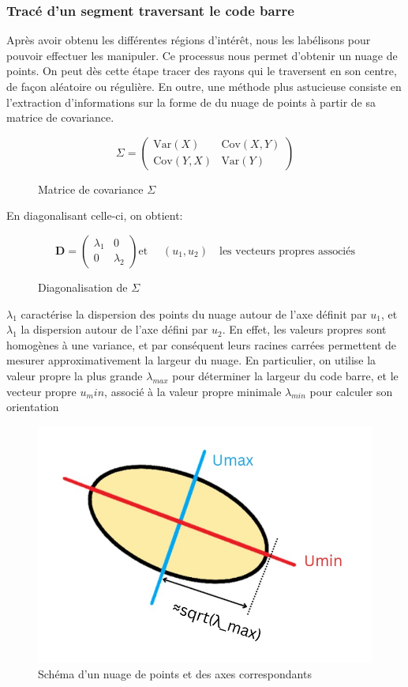 \documentclass{rapport}
\begin{document}
\subsubsection*{Tracé d'un segment traversant le code barre}
Après avoir obtenu les différentes régions d’intérêt, nous les labélisons pour pouvoir effectuer les manipuler.
Ce processus nous permet d'obtenir un nuage de points. 
On peut dès cette étape tracer des rayons qui le traversent en son centre, de façon aléatoire ou régulière.
En outre, une méthode plus astucieuse consiste en l'extraction d'informations sur la forme de du nuage de points à partir de sa matrice de covariance. 
\begin{figure}[h!]
$$\Sigma = \begin{pmatrix} \text{Var}(X) & \text{Cov}(X, Y) \\ \text{Cov}(Y, X) & \text{Var}(Y) \end{pmatrix}$$
\caption{Matrice de covariance $\Sigma$}
\end{figure}
En diagonalisant celle-ci, on obtient:
\begin{figure}[h!]
$$\mathbf{D} = \begin{pmatrix} \lambda_1 & 0 \\ 0 & \lambda_2 \end{pmatrix} \text{et } \quad (u_1,u_2) \quad \text{les vecteurs propres associés}$$
\caption{Diagonalisation de $\Sigma$}
\end{figure}
$\lambda_1$ caractérise la dispersion des points du nuage autour de l'axe définit par $u_1$, et $\lambda_1$ la dispersion autour de l'axe défini par $u_2$.
En effet, les valeurs propres sont homogènes à une variance, et par conséquent leurs racines carrées permettent de mesurer approximativement la largeur du nuage. En particulier, on utilise la valeur propre la plus grande $\lambda_{max}$ pour déterminer la largeur du code barre, et le vecteur propre $u_min$, associé à la valeur propre minimale $\lambda_{min}$ pour calculer son orientation
\begin{figure}[H]
    \centering
    \includegraphics[width=0.5\linewidth]{images/Detection/nuage_leg.jpg}
    \caption{Schéma d'un nuage de points et des axes correspondants}
    \label{fig:nuage}
\end{figure}
\end{document}
